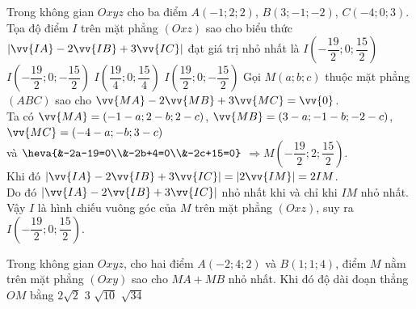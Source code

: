 \begin{ex}%
	Trong không gian $Oxyz$ cho ba điểm $A(-1;2;2)$, $B(3;-1;-2)$, $C(-4;0;3)$. Tọa độ điểm $I$ trên mặt phẳng $(Oxz)$ sao cho biểu thức $\left|\vv{IA}-2\vv{IB}+3\vv{IC}\right|$ đạt giá trị nhỏ nhất là
	\choice
	{\True $I\left(-\dfrac{19}{2};0;\dfrac{15}{2}\right)$}
	{$I\left(-\dfrac{19}{2};0;-\dfrac{15}{2}\right)$}
	{$I\left(\dfrac{19}{4};0;\dfrac{15}{4}\right)$}
	{$I\left(\dfrac{19}{2};0;-\dfrac{15}{2}\right)$}
	\loigiai
	{Gọi $M(a;b;c)$ thuộc mặt phẳng $(ABC)$ sao cho $\vv{MA}-2\vv{MB}+3\vv{MC}=\vv{0}$.\\
		Ta có $\vv{MA}=(-1-a;2-b;2-c)$, $\vv{MB}=(3-a;-1-b;-2-c)$, $\vv{MC}=(-4-a;-b;3-c)$\\
		và $\heva{&-2a-19=0\\&-2b+4=0\\&-2c+15=0}$ $\Rightarrow M\left(-\dfrac{19}{2};2;\dfrac{15}{2}\right)$.\\
		Khi đó $\left|\vv{IA}-2\vv{IB}+3\vv{IC}\right|=\left|2\vv{IM}\right|=2IM$.\\
		Do đó $\left|\vv{IA}-2\vv{IB}+3\vv{IC}\right|$ nhỏ nhất khi và chỉ khi $IM$ nhỏ nhất. Vậy $I$ là hình chiếu vuông góc của $M$ trên mặt phẳng $(Oxz)$, suy ra $I\left(-\dfrac{19}{2};0;\dfrac{15}{2}\right)$.
	}
\end{ex}
\begin{ex}%
	Trong không gian $Oxyz$, cho hai điểm $A(-2;4;2)$ và $B(1;1;4)$, điểm $M$ nằm trên mặt phẳng $(Oxy)$ sao cho $MA+MB$ nhỏ nhất. Khi đó độ dài đoạn thẳng $OM$ bằng
	\choice
	{$2\sqrt{2}$}
	{$3$}
	{\True $\sqrt{10}$}
	{$\sqrt{34}$}
\end{ex}
